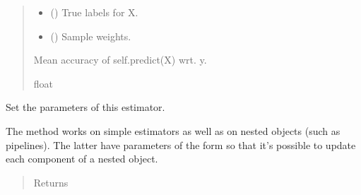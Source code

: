 \documentclass[letterpaper,10pt,english]{sphinxmanual}
\begin{document}
{\begin{fulllineitems}
\begin{fulllineitems}
\begin{quote}
\begin{description}
\begin{itemize}
\item {} 
 (\sphinxstyleliteralemphasis{\sphinxupquote{, }}\sphinxstyleliteralemphasis{\sphinxupquote{ (}}\sphinxstyleliteralemphasis{\sphinxupquote{(}}\sphinxstyleliteralemphasis{\sphinxupquote{, }}\sphinxstyleliteralemphasis{\sphinxupquote{)}}) \textendash{} True labels for X.

\item {} 
 (\sphinxstyleliteralemphasis{\sphinxupquote{, }}\sphinxstyleliteralemphasis{\sphinxupquote{ {[}}}\sphinxstyleliteralemphasis{\sphinxupquote{{]}}}\sphinxstyleliteralemphasis{\sphinxupquote{, }}) \textendash{} Sample weights.

\end{itemize}

\item[{Returns}] \leavevmode
{} \textendash{} Mean accuracy of self.predict(X) wrt. y.

\item[{Return type}] \leavevmode
float

\end{description}\end{quote}

\end{fulllineitems}


\begin{fulllineitems}
\label{\detokenize{api_reference:group_lasso.LogisticGroupLasso.set_params}}
Set the parameters of this estimator.

The method works on simple estimators as well as on nested objects
(such as pipelines). The latter have parameters of the form
 so that it’s possible to update each
component of a nested object.
\begin{quote}\begin{description}
\item[{Returns}] \leavevmode



\end{description}
\end{quote}
\end{fulllineitems}
\end{fulllineitems}}
\end{document}
